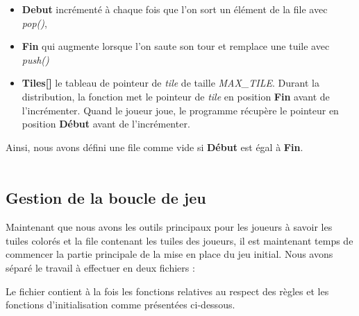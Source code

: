 \documentclass[a4paper]{article}
\begin{document}
\begin{itemize}
\item \textbf{Debut} incrémenté à chaque fois que l'on sort un élément de la file avec \emph{pop()},
\item \textbf{Fin} qui augmente lorsque l'on saute son tour et remplace une tuile avec \emph{push()}
\item \textbf{Tiles[]} le tableau de pointeur de \emph{tile} de taille \emph{MAX\_TILE}. Durant la distribution, la fonction met le pointeur de \emph{tile} en position \textbf{Fin} avant de l'incrémenter. Quand le joueur joue, le programme récupère le pointeur en position \textbf{Début} avant de l'incrémenter. \\
\end{itemize}
Ainsi, nous avons défini une file comme vide si \textbf{Début} est égal à \textbf{Fin}. \\ \\



\subsection{Gestion de la boucle de jeu}
Maintenant que nous avons les outils principaux pour les joueurs à savoir les tuiles colorés et la file contenant les tuiles des joueurs, il est maintenant temps de commencer la partie principale de la mise en place du jeu initial.
Nous avons séparé le travail à effectuer en deux fichiers :

Le fichier  contient à la fois les fonctions relatives au respect des règles et les fonctions d'initialisation comme présentées ci-dessous. \\
\end{document}

